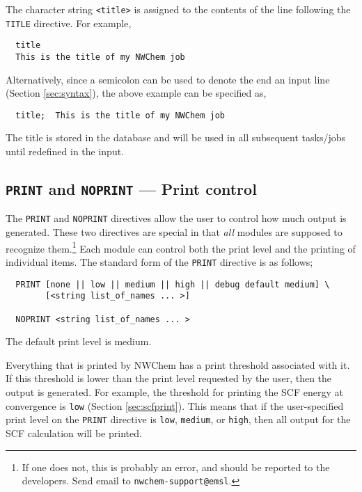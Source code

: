 The character string \verb+<title>+ is assigned to the contents of the
line following the \verb+TITLE+ directive.  For example,

\begin{verbatim}
  title
  This is the title of my NWChem job
\end{verbatim}

Alternatively, since a semicolon can be used to denote the end an input line
(Section \ref{sec:syntax}), the above example can be specified as,

\begin{verbatim}
  title;  This is the title of my NWChem job
\end{verbatim}

The title is stored in the database and will be used in all subsequent
tasks/jobs until redefined in the input.

\subsection{{\tt PRINT} and {\tt NOPRINT} --- Print control}
\label{sec:printcontrol}

The \verb+PRINT+ and \verb+NOPRINT+ directives allow the user to
control how much output is generated.  These two directives are
special in that {\em all} modules are supposed to recognize
them.\footnote{If one does not, this is probably an error, and should
  be reported to the developers.  Send email to
  \verb+nwchem-support@emsl+.} Each module can control both the print
level and the printing of individual items.  The standard form of the
\verb+PRINT+ directive is as follows;

\begin{verbatim}
  PRINT [none || low || medium || high || debug default medium] \
        [<string list_of_names ... >]

  NOPRINT <string list_of_names ... >
\end{verbatim}
The default print level is medium.

Everything that is printed by NWChem has a print threshold associated
with it. If this threshold is lower than the print level requested by
the user, then the output is generated.  For example, the threshold
for printing the SCF energy at convergence is \verb+low+ (Section
\ref{sec:scfprint}).  This means that if the user-specified print level 
on the \verb+PRINT+ directive is
\verb+low+, \verb+medium+, or \verb+high+, then all output for the
SCF calculation will be printed.  

